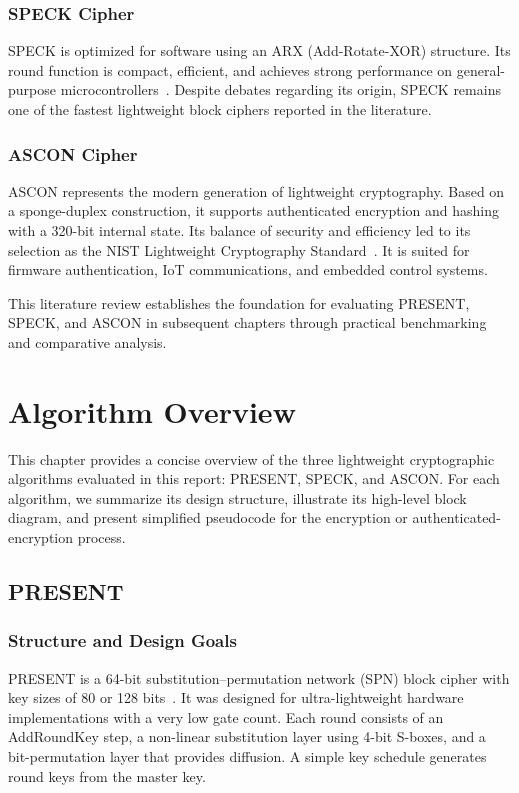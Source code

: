 \documentclass[12pt]{report}
\begin{document}
\subsection{SPECK Cipher}

SPECK is optimized for software using an ARX (Add-Rotate-XOR) structure. Its round function is
compact, efficient, and achieves strong performance on general-purpose microcontrollers~\cite{beaulieu2015simon}.
Despite debates regarding its origin, SPECK remains one of the fastest lightweight block ciphers
reported in the literature.

\subsection{ASCON Cipher}

ASCON represents the modern generation of lightweight cryptography. Based on a sponge-duplex
construction, it supports authenticated encryption and hashing with a 320-bit internal state.
Its balance of security and efficiency led to its selection as the NIST Lightweight Cryptography
Standard~\cite{dobraunig2016ascon,nist2023lwc}. It is suited for firmware authentication, IoT
communications, and embedded control systems.

\bigskip
This literature review establishes the foundation for evaluating PRESENT, SPECK, and ASCON
in subsequent chapters through practical benchmarking and comparative analysis.

\chapter{Algorithm Overview}

This chapter provides a concise overview of the three lightweight cryptographic algorithms
evaluated in this report: PRESENT, SPECK, and ASCON. For each algorithm, we summarize
its design structure, illustrate its high-level block diagram, and present simplified
pseudocode for the encryption or authenticated-encryption process.

\section{PRESENT}

\subsection*{Structure and Design Goals}

PRESENT is a 64-bit substitution–permutation network (SPN) block cipher with key sizes
of 80 or 128 bits~\cite{bogdanov2007present}. It was designed for ultra-lightweight
hardware implementations with a very low gate count. Each round consists of an
AddRoundKey step, a non-linear substitution layer using 4-bit S-boxes, and a bit-permutation
layer that provides diffusion. A simple key schedule generates round keys from the master key.
\end{document}
